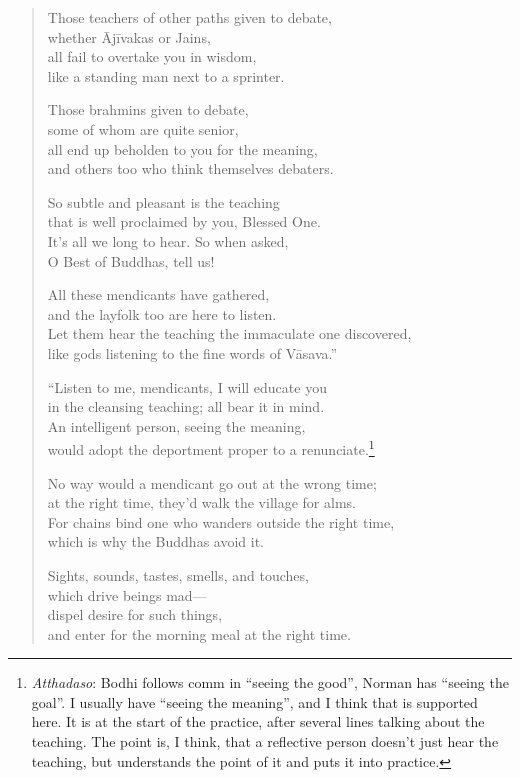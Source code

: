\documentclass[12pt,openany]{book}%
\begin{document}
\begin{verse}
Those teachers of other paths given to debate, \\
whether \textsanskrit{Ājīvakas} or Jains, \\
all fail to overtake you in wisdom, \\
like a standing man next to a sprinter. 

Those brahmins given to debate, \\
some of whom are quite senior, \\
all end up beholden to you for the meaning, \\
and others too who think themselves debaters. 

So subtle and pleasant is the teaching \\
that is well proclaimed by you, Blessed One. \\
It’s all we long to hear. So when asked, \\
O Best of Buddhas, tell us! 

All these mendicants have gathered, \\
and the layfolk too are here to listen. \\
Let them hear the teaching the immaculate one discovered, \\
like gods listening to the fine words of \textsanskrit{Vāsava}.” 

“Listen to me, mendicants, I will educate you \\
in the cleansing teaching; all bear it in mind. \\
An intelligent person, seeing the meaning, \\
would adopt the deportment proper to a renunciate.\footnote{\textit{Atthadaso}: Bodhi follows comm in “seeing the good”, Norman has “seeing the goal”. I usually have “seeing the meaning”, and I think that is supported here. It is at the start of the practice, after several lines talking about the teaching. The point is, I think, that a reflective person doesn't just hear the teaching, but understands the point of it and puts it into practice. } 

No way would a mendicant go out at the wrong time; \\
at the right time, they’d walk the village for alms. \\
For chains bind one who wanders outside the right time, \\
which is why the Buddhas avoid it. 

Sights, sounds, tastes, smells, and touches, \\
which drive beings mad—\\
dispel desire for such things, \\
and enter for the morning meal at the right time. 


\end{verse}
\end{document}
